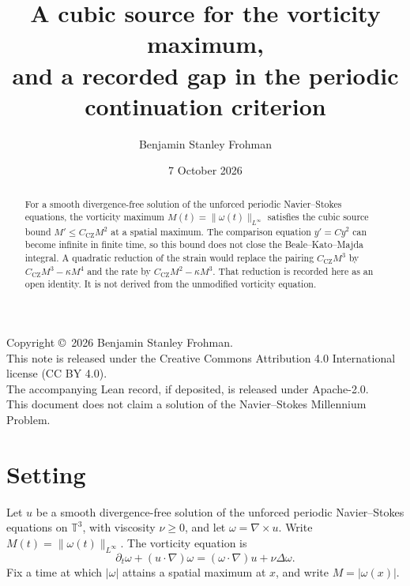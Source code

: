 \documentclass[11pt]{article}
\title{A cubic source for the vorticity maximum,\\ and a recorded gap in the periodic continuation criterion}
\author{Benjamin Stanley Frohman}
\date{7 October 2026}
\theoremstyle{definition}
\theoremstyle{remark}
\begin{document}
\maketitle
\begin{center}
Copyright \copyright\ 2026 Benjamin Stanley Frohman.\\
This note is released under the Creative Commons Attribution 4.0 International license (CC BY 4.0).\\
The accompanying Lean record, if deposited, is released under Apache-2.0.\\
This document does not claim a solution of the Navier--Stokes Millennium Problem.
\end{center}

\begin{abstract}
For a smooth divergence-free solution of the unforced periodic Navier--Stokes equations, the vorticity maximum $M(t)=\|\omega(t)\|_{L^\infty}$ satisfies the cubic source bound $M'\le C_{\mathrm{CZ}} M^2$ at a spatial maximum. The comparison equation $y'=C y^2$ can become infinite in finite time, so this bound does not close the Beale--Kato--Majda integral. A quadratic reduction of the strain would replace the pairing $C_{\mathrm{CZ}} M^3$ by $C_{\mathrm{CZ}} M^3-\kappa M^4$ and the rate by $C_{\mathrm{CZ}} M^2-\kappa M^3$. That reduction is recorded here as an open identity. It is not derived from the unmodified vorticity equation.
\end{abstract}

\section{Setting}
Let $u$ be a smooth divergence-free solution of the unforced periodic Navier--Stokes equations on $\mathbb{T}^3$, with viscosity $\nu\ge 0$, and let $\omega=\nabla\times u$. Write $M(t)=\|\omega(t)\|_{L^\infty}$. The vorticity equation is
\[
\partial_t\omega+(u\cdot\nabla)\omega=(\omega\cdot\nabla)u+\nu\Delta\omega.
\]
Fix a time at which $|\omega|$ attains a spatial maximum at $x$, and write $M=|\omega(x)|$.
\end{document}
